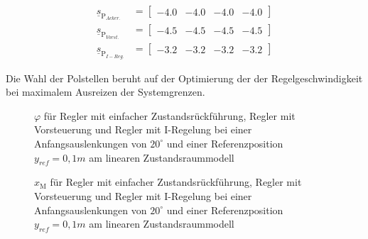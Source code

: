 \begin{align*}
    \underline{s}_{\mathrm{P}_{Acker.}} &= 
    \begin{bmatrix}
        -4.0 & -4.0 & -4.0 & -4.0 
    \end{bmatrix} \\
    \underline{s}_{\mathrm{P}_{Vorst.}} &= 
    \begin{bmatrix}
        -4.5 & -4.5 & -4.5 & -4.5 
    \end{bmatrix} \\
    \underline{s}_{\mathrm{P}_{I-Reg.}} &= 
    \begin{bmatrix}
        -3.2 & -3.2 & -3.2 & -3.2 
    \end{bmatrix}
\end{align*}

Die Wahl der Polstellen beruht auf der Optimierung der der Regelgeschwindigkeit bei maximalem Ausreizen der Systemgrenzen.

\begin{figure}[H]
    \centering
    \caption[Reglervergleich für $\varphi$ (linear)]{$\varphi$ für Regler mit einfacher Zustandsrückführung, Regler mit Vorsteuerung und Regler mit I-Regelung bei einer Anfangsauslenkungen von $20^\circ$ und einer Referenzposition $y_{ref} = 0,1 m$ am linearen Zustandsraummodell}
    \label{fig:Bild25}
\end{figure}

\begin{figure}[H]
    \centering
    \caption[Reglervergleich für $x_{\mathrm{M}}$ (linear)]{$x_{\mathrm{M}}$ für Regler mit einfacher Zustandsrückführung, Regler mit Vorsteuerung und Regler mit I-Regelung bei einer Anfangsauslenkungen von $20^\circ$ und einer Referenzposition $y_{ref} = 0,1 m$ am linearen Zustandsraummodell}
    \label{fig:Bild26}
\end{figure}

